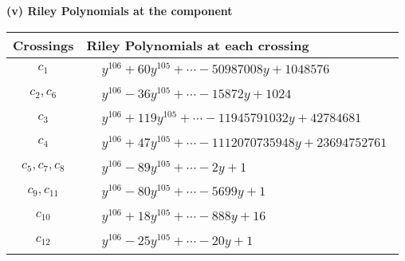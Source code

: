 \documentclass[1p]{elsarticle_modified}
\theoremstyle{definition}
\begin{document}
\newpage\renewcommand{\arraystretch}{1}
\flushleft \textbf{(v) Riley Polynomials at the component}\newline \\
\begin{tabular}{m{50pt}|m{274pt}}
Crossings & \hspace{64pt}Riley Polynomials at each crossing \\
\hline $$\begin{aligned}c_{1}\end{aligned}$$&$\begin{aligned}
&y^{106}+60 y^{105}+\cdots-50987008 y+1048576
\end{aligned}$\\
\hline $$\begin{aligned}c_{2},c_{6}\end{aligned}$$&$\begin{aligned}
&y^{106}-36 y^{105}+\cdots-15872 y+1024
\end{aligned}$\\
\hline $$\begin{aligned}c_{3}\end{aligned}$$&$\begin{aligned}
&y^{106}+119 y^{105}+\cdots-11945791032 y+42784681
\end{aligned}$\\
\hline $$\begin{aligned}c_{4}\end{aligned}$$&$\begin{aligned}
&y^{106}+47 y^{105}+\cdots-1112070735948 y+23694752761
\end{aligned}$\\
\hline $$\begin{aligned}c_{5},c_{7},c_{8}\end{aligned}$$&$\begin{aligned}
&y^{106}-89 y^{105}+\cdots-2 y+1
\end{aligned}$\\
\hline $$\begin{aligned}c_{9},c_{11}\end{aligned}$$&$\begin{aligned}
&y^{106}-80 y^{105}+\cdots-5699 y+1
\end{aligned}$\\
\hline $$\begin{aligned}c_{10}\end{aligned}$$&$\begin{aligned}
&y^{106}+18 y^{105}+\cdots-888 y+16
\end{aligned}$\\
\hline $$\begin{aligned}c_{12}\end{aligned}$$&$\begin{aligned}
&y^{106}-25 y^{105}+\cdots-20 y+1
\end{aligned}$\\
\hline
\end{tabular}\\~\\
\end{document}
